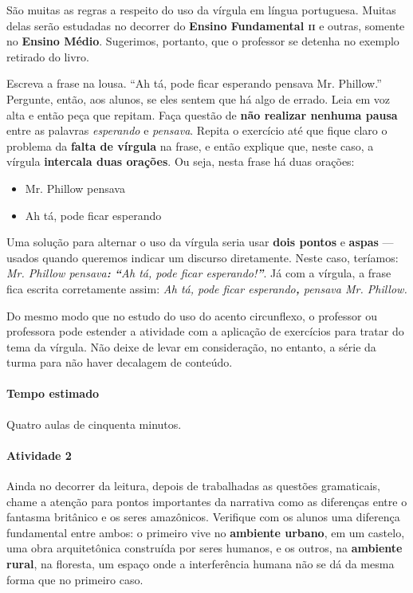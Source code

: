 \documentclass[11pt]{extarticle}
\begin{document}
São muitas as regras a respeito do uso da  vírgula em língua portuguesa. 
Muitas delas serão estudadas no decorrer do \textbf{Ensino Fundamental \textsc{ii}} e outras,
somente no \textbf{Ensino Médio}. 
Sugerimos, portanto, que o professor se detenha no exemplo retirado do livro. 

Escreva a frase na lousa. ``Ah tá, pode ficar esperando pensava Mr. Phillow.''
Pergunte, então, aos alunos, se eles sentem que há algo de errado. Leia em voz
alta e então peça que repitam. Faça questão de \textbf{não realizar nenhuma pausa}
entre as palavras \textit{esperando} e \textit{pensava}.
Repita o exercício até que fique claro o problema da \textbf{falta de vírgula} na frase,
e então explique que, neste caso, a vírgula \textbf{intercala duas orações}. 
Ou seja, nesta frase há duas orações:

\begin{itemize}
	\item Mr. Phillow pensava
	\item Ah tá, pode ficar esperando
\end{itemize}

Uma solução para alternar o uso da vírgula seria usar \textbf{dois pontos} e \textbf{aspas} ---
usados quando queremos indicar um discurso diretamente. 
Neste caso, teríamos: \textit{Mr. Phillow pensava\textbf{:} \textbf{``}Ah tá, pode ficar esperando!\textbf{''}}.
Já com a vírgula, a frase fica escrita corretamente assim: \textit{Ah tá, pode ficar esperando\textbf{,}
pensava Mr. Phillow.}

Do mesmo modo que no estudo do uso do acento circunflexo, o professor ou professora pode estender
a atividade com a aplicação de exercícios para tratar do tema da vírgula.
Não deixe de levar em consideração, no entanto, a série da turma para não haver
decalagem de conteúdo. 

\paragraph{Tempo estimado} Quatro aulas de cinquenta minutos.

\paragraph{Atividade 2}

Ainda no decorrer da leitura, depois de trabalhadas as questões gramaticais, 
chame a atenção para pontos importantes da narrativa como as diferenças entre 
o fantasma britânico e os seres amazônicos. Verifique com os alunos uma diferença
fundamental entre ambos: o primeiro vive no \textbf{ambiente urbano}, em um castelo, uma 
obra arquitetônica construída por seres humanos, e os outros, na \textbf{ambiente rural},
na floresta, um espaço onde a interferência humana não se dá da mesma forma que 
no primeiro caso. 
\end{document}
